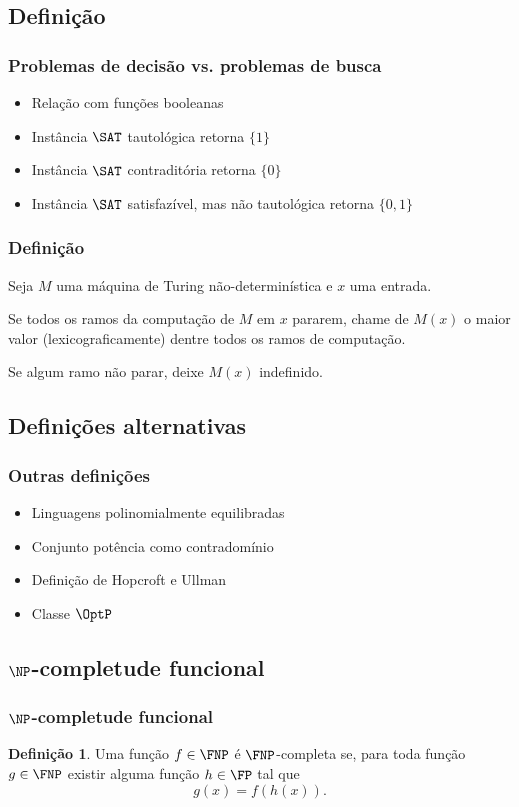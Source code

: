 \documentclass[utf8,notheorems]{beamer}
\theoremstyle{definition}
\newtheorem*{definition}{Definição}
\begin{document}
\subsection{Definição}
\begin{frame}
    \frametitle{Problemas de decisão vs. problemas de busca}
    \begin{itemize}
        \item Relação com funções booleanas
        \item Instância $\SAT$ tautológica retorna $\{1\}$
        \item Instância $\SAT$ contraditória retorna $\{0\}$
        \item Instância $\SAT$ satisfazível, mas não tautológica retorna $\{0, 1\}$
    \end{itemize}
\end{frame}
\begin{frame}
    \frametitle{Definição}
    Seja $M$ uma máquina de Turing não-determinística
    e $x$ uma entrada.

    Se todos os ramos da computação de $M$ em $x$ pararem,
    chame de $M(x)$ o maior valor
    (lexicograficamente)
    dentre todos os ramos de computação.

    Se algum ramo não parar,
    deixe $M(x)$ indefinido.
\end{frame}

\subsection{Definições alternativas}
\begin{frame}
    \frametitle{Outras definições}
    \begin{itemize}
        \item Linguagens polinomialmente equilibradas
        \item Conjunto potência como contradomínio
        \item Definição de Hopcroft e Ullman
        \item Classe $\OptP$
    \end{itemize}
\end{frame}

\subsection{$\NP$-completude funcional}
\begin{frame}
    \frametitle{$\NP$-completude funcional}
    \begin{definition}
        Uma função $f \in \FNP$ é $\FNP$-completa se,
        para toda função $g \in \FNP$
        existir alguma função $h \in \FP$ tal que
        \begin{equation*}
            g(x) = f(h(x)).
        \end{equation*}
    \end{definition}
\end{frame}
\end{document}
